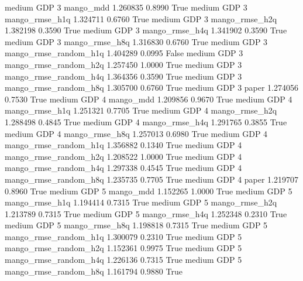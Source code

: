     medium      GDP                 3             mango_mdd   1.260835      0.8990    True
    medium      GDP                 3        mango_rmse_h1q   1.324711      0.6760    True
    medium      GDP                 3        mango_rmse_h2q   1.382198      0.3590    True
    medium      GDP                 3        mango_rmse_h4q   1.341902      0.3590    True
    medium      GDP                 3        mango_rmse_h8q   1.316830      0.6760    True
    medium      GDP                 3 mango_rmse_random_h1q   1.404289      0.0995   False
    medium      GDP                 3 mango_rmse_random_h2q   1.257450      1.0000    True
    medium      GDP                 3 mango_rmse_random_h4q   1.364356      0.3590    True
    medium      GDP                 3 mango_rmse_random_h8q   1.305700      0.6760    True
    medium      GDP                 3                 paper   1.274056      0.7530    True
    medium      GDP                 4             mango_mdd   1.209856      0.9670    True
    medium      GDP                 4        mango_rmse_h1q   1.251321      0.7705    True
    medium      GDP                 4        mango_rmse_h2q   1.288498      0.4845    True
    medium      GDP                 4        mango_rmse_h4q   1.291765      0.3855    True
    medium      GDP                 4        mango_rmse_h8q   1.257013      0.6980    True
    medium      GDP                 4 mango_rmse_random_h1q   1.356882      0.1340    True
    medium      GDP                 4 mango_rmse_random_h2q   1.208522      1.0000    True
    medium      GDP                 4 mango_rmse_random_h4q   1.297338      0.4545    True
    medium      GDP                 4 mango_rmse_random_h8q   1.235735      0.7705    True
    medium      GDP                 4                 paper   1.219707      0.8960    True
    medium      GDP                 5             mango_mdd   1.152265      1.0000    True
    medium      GDP                 5        mango_rmse_h1q   1.194414      0.7315    True
    medium      GDP                 5        mango_rmse_h2q   1.213789      0.7315    True
    medium      GDP                 5        mango_rmse_h4q   1.252348      0.2310    True
    medium      GDP                 5        mango_rmse_h8q   1.198818      0.7315    True
    medium      GDP                 5 mango_rmse_random_h1q   1.300079      0.2310    True
    medium      GDP                 5 mango_rmse_random_h2q   1.152361      0.9975    True
    medium      GDP                 5 mango_rmse_random_h4q   1.226136      0.7315    True
    medium      GDP                 5 mango_rmse_random_h8q   1.161794      0.9880    True
